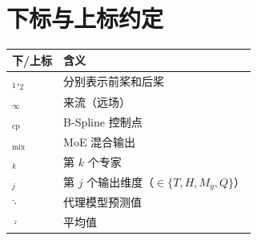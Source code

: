 \section*{下标与上标约定}

\begin{tabular}{p{2cm}p{10cm}}
\toprule
\textbf{下/上标} & \textbf{含义}                                          \\
\midrule
$_1, _2$        & 分别表示前桨和后桨                                       \\
$_\infty$       & 来流（远场）                                            \\
$_\text{cp}$    & B-Spline 控制点                                         \\
$_\text{mix}$   & MoE 混合输出                                            \\
$_k$            & 第 $k$ 个专家                                           \\
$_j$            & 第 $j$ 个输出维度（$\in\{T, H, M_y, Q\}$）              \\
$\hat\cdot$     & 代理模型预测值                                          \\
$\bar\cdot$     & 平均值                                                 \\
\bottomrule
\end{tabular}
